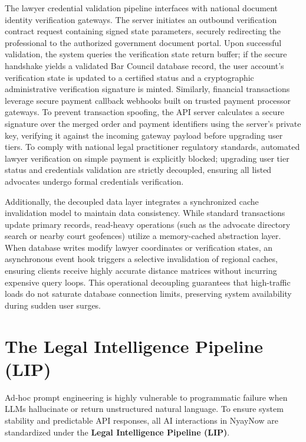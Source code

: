 \documentclass[conference]{IEEEtran}
\begin{document}
The lawyer credential validation pipeline interfaces with national document identity verification gateways. The server initiates an outbound verification contract request containing signed state parameters, securely redirecting the professional to the authorized government document portal. Upon successful validation, the system queries the verification state return buffer; if the secure handshake yields a validated Bar Council database record, the user account's verification state is updated to a certified status and a cryptographic administrative verification signature is minted. Similarly, financial transactions leverage secure payment callback webhooks built on trusted payment processor gateways. To prevent transaction spoofing, the API server calculates a secure signature over the merged order and payment identifiers using the server's private key, verifying it against the incoming gateway payload before upgrading user tiers. To comply with national legal practitioner regulatory standards, automated lawyer verification on simple payment is explicitly blocked; upgrading user tier status and credentials validation are strictly decoupled, ensuring all listed advocates undergo formal credentials verification.

Additionally, the decoupled data layer integrates a synchronized cache invalidation model to maintain data consistency. While standard transactions update primary records, read-heavy operations (such as the advocate directory search or nearby court geofences) utilize a memory-cached abstraction layer. When database writes modify lawyer coordinates or verification states, an asynchronous event hook triggers a selective invalidation of regional caches, ensuring clients receive highly accurate distance matrices without incurring expensive query loops. This operational decoupling guarantees that high-traffic loads do not saturate database connection limits, preserving system availability during sudden user surges.

\section{The Legal Intelligence Pipeline (LIP)}
\label{sec:lip}

Ad-hoc prompt engineering is highly vulnerable to programmatic failure when LLMs hallucinate or return unstructured natural language. To ensure system stability and predictable API responses, all AI interactions in NyayNow are standardized under the \textbf{Legal Intelligence Pipeline (LIP)}.
\end{document}

